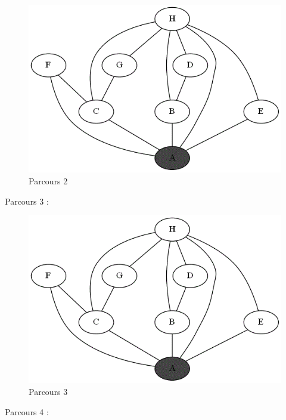 \documentclass[
  a4paper,
  DIV=11,
  numbers=noendperiod]{scrartcl}
\begin{document}
\begin{figure}

{\centering \includegraphics{exos_graphes_fiche1_files/mediabag/a2_reperer_profondeu1.gif}

}

\caption{Parcours 2}

\end{figure}

Parcours 3 :

\begin{figure}

{\centering \includegraphics{exos_graphes_fiche1_files/mediabag/a2_reperer_profondeu12.gif}

}

\caption{Parcours 3}

\end{figure}

Parcours 4 :
\end{document}
